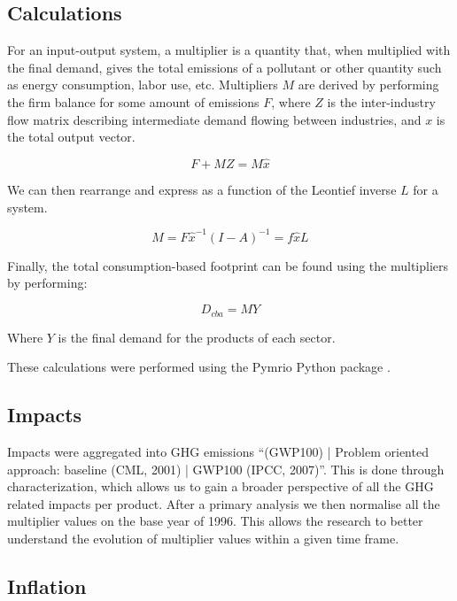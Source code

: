 \documentclass[a4paper,twoside]{article}
\begin{document}
\subsection{Calculations}

For an input-output system, a multiplier is a quantity that, when multiplied with the final demand, gives the total emissions of a pollutant or other quantity such as energy consumption, labor use, etc. Multipliers $M$ are derived by performing the firm balance for some amount of emissions $F$, where $Z$ is the inter-industry flow matrix describing intermediate demand flowing between industries, and $x$ is the total output vector.

\begin{equation}
F + M Z = M \hat{x}
\end{equation}

We can then rearrange and express as a function of the Leontief inverse $L$ for a system.

\begin{equation}
M = F \hat{x}^{-1} (I - A)^{-1} = f \hat{x} L
\end{equation}

Finally, the total consumption-based footprint can be found using the multipliers by performing:

\begin{equation}
D_{cba} = M Y
\end{equation}

Where $Y$ is the final demand for the products of each sector.

These calculations were performed using the Pymrio Python package \cite{stadler2021}.

\subsection{Impacts}

Impacts were aggregated into GHG emissions “(GWP100) | Problem oriented approach: baseline (CML, 2001) | GWP100 (IPCC, 2007)”. This is done through characterization, which allows us to gain a broader perspective of all the GHG related impacts per product. After a primary analysis we then normalise all the multiplier values on the base year of 1996. This allows the research to better understand the evolution of multiplier values within a given time frame.

\subsection{Inflation}
\end{document}
